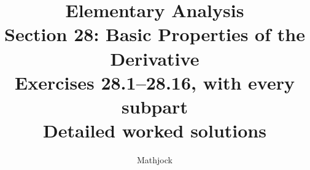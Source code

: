 
\title{\textbf{Elementary Analysis}\\[0.3em]
Section 28: Basic Properties of the Derivative\\[0.4em]
\large Exercises 28.1--28.16, with every subpart\\
Detailed worked solutions}
\author{Mathjock}
\date{}

\maketitle
\bookinfo
\tableofcontents
\clearpage
\setcounter{section}{27}



